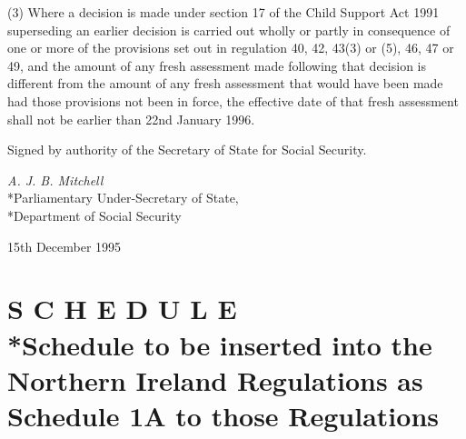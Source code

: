 \documentclass[12pt,a4paper]{article}
\begin{document}
(3) 
Where a decision is made under section 17 of the Child Support Act 1991 superseding an earlier decision  %
is carried out wholly or partly in consequence of one or more of the provisions set out in 
regulation 40, 42, 43(3) or (5), 46, 47 or 49,  %
and the amount of any fresh assessment made following 
that decision  %
is different from the amount of any fresh assessment that would have been made had those provisions not been in force, the effective date of that fresh assessment shall not be earlier than 22nd January 1996.



\bigskip

Signed by authority of the Secretary of State for Social Security.

{\raggedleft
\emph{A. J. B. Mitchell}\\*Parliamentary Under-Secretary of State,\\*Department of Social Security

}

15th December 1995

\clearpage

\part[Schedule --- Schedule to be inserted into the Northern Ireland Regulations as Schedule 1A to those Regulations]{S C H E D U L E\\*Schedule to be inserted into the Northern Ireland Regulations as Schedule 1A to those Regulations}
\end{document}
